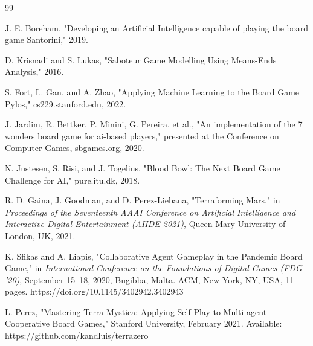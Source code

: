 \documentclass{telkomnika}
\begin{document}


%


\begin{thebibliography} {99} 
\footnotesize
\itemsep 0pt 



J. E. Boreham, "Developing an Artificial Intelligence capable of playing the board game Santorini," 2019.

D. Krisnadi and S. Lukas, "Saboteur Game Modelling Using Means-Ends Analysis," 2016.

S. Fort, L. Gan, and A. Zhao, "Applying Machine Learning to the Board Game Pylos," cs229.stanford.edu, 2022.

J. Jardim, R. Bettker, P. Minini, G. Pereira, et al., "An implementation of the 7 wonders board game for ai-based players," presented at the Conference on Computer Games, sbgames.org, 2020.

N. Justesen, S. Risi, and J. Togelius, "Blood Bowl: The Next Board Game Challenge for AI," pure.itu.dk, 2018.

R. D. Gaina, J. Goodman, and D. Perez-Liebana, "Terraforming Mars," in \textit{Proceedings of the Seventeenth AAAI Conference on Artificial Intelligence and Interactive Digital Entertainment (AIIDE 2021)}, Queen Mary University of London, UK, 2021.

K. Sfikas and A. Liapis, "Collaborative Agent Gameplay in the Pandemic Board Game," in \textit{International Conference on the Foundations of Digital Games (FDG '20)}, September 15–18, 2020, Bugibba, Malta. ACM, New York, NY, USA, 11 pages. https://doi.org/10.1145/3402942.3402943

L. Perez, "Mastering Terra Mystica: Applying Self-Play to Multi-agent Cooperative Board Games," Stanford University, February 2021. Available: https://github.com/kandluis/terrazero


\end{thebibliography}
\end{document}
